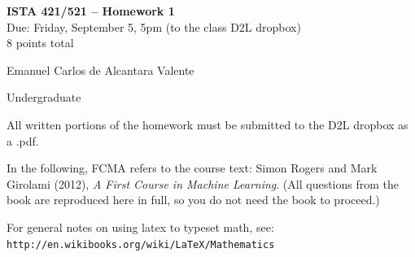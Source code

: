 \documentclass[10pt]{article}
\begin{document}
\begin{center}
    {\Large {\bf ISTA 421/521 -- Homework 1}} \\
    Due: Friday, September 5, 5pm (to the class D2L dropbox) \\
    8 points total
\end{center}

\begin{flushright}
Emanuel Carlos de Alcantara Valente  %

Undergraduate %
\end{flushright}

\vspace{1cm}
All written portions of the homework must be submitted to the D2L dropbox as a .pdf.

In the following, FCMA refers to the course text: Simon Rogers and Mark Girolami (2012), {\em A First Course in Machine Learning}.  (All questions from the book are reproduced here in full, so you do not need the book to proceed.)

For general notes on using latex to typeset math, see: {\tt http://en.wikibooks.org/wiki/LaTeX/Mathematics}
\vspace{.5cm}

\end{document}
